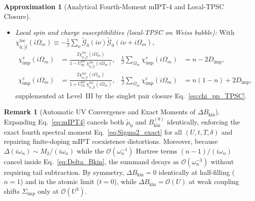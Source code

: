 \documentclass[11pt,a4paper]{article}
\numberwithin{equation}{section}
\theoremstyle{plain}
\theoremstyle{definition}
\newtheorem{approximation}{Approximation}[section]
\newtheorem{remark}{Remark}[section]
\begin{document}
\begin{approximation}[Analytical Fourth-Moment mIPT-4 and Local-TPSC Closure]
\begin{itemize}
    \item[(iii)] \emph{Local spin and charge susceptibilities (local-TPSC on Weiss bubble):}
    With $\chi_{0,\tilde{\mathcal{G}}}^{\mathrm{loc}}(i\Omega_m) \equiv -\frac{1}{\beta}\sum_\nu \tilde{\mathcal{G}}_0(i\nu)\tilde{\mathcal{G}}_0(i\nu+i\Omega_m)$,
    \begin{align}
        \chi_{\mathrm{imp}}^s(i\Omega_m)
        &= \frac{2\chi_{0,\tilde{\mathcal{G}}}^{\mathrm{loc}}(i\Omega_m)}
                {1 - U_{\mathrm{sp}}^{\mathrm{loc}}\,\chi_{0,\tilde{\mathcal{G}}}^{\mathrm{loc}}(i\Omega_m)},
        &
        \frac{1}{\beta}\sum_{\Omega_m} \chi_{\mathrm{imp}}^s(i\Omega_m)
        &= n - 2D_{\mathrm{imp}},
        \label{eq:chi_s_TPSC} \\
        \chi_{\mathrm{imp}}^c(i\Omega_m)
        &= \frac{2\chi_{0,\tilde{\mathcal{G}}}^{\mathrm{loc}}(i\Omega_m)}
                {1 + U_{\mathrm{ch}}^{\mathrm{loc}}\,\chi_{0,\tilde{\mathcal{G}}}^{\mathrm{loc}}(i\Omega_m)},
        &
        \frac{1}{\beta}\sum_{\Omega_m} \chi_{\mathrm{imp}}^c(i\Omega_m)
        &= n(1 - n) + 2D_{\mathrm{imp}},
        \label{eq:chi_c_TPSC}
    \end{align}
    supplemented at Level~III by the singlet pair closure Eq.~\eqref{eq:chi_pp_TPSC}.
\end{itemize}
\end{approximation}

\begin{remark}[Automatic UV Convergence and Exact Moments of $\Delta B_{\mathrm{kin}}$]
\label{rem:Bkin_conv}
Expanding Eq.~\eqref{eq:mIPT4} cancels both $\tilde{\mu}_0$ and $B_{\mathrm{kin}}^{(0)}$
identically, enforcing the exact fourth spectral moment Eq.~\eqref{eq:Sigma2_exact} for
all $(U,t,T,\delta)$ and repairing finite-doping mIPT coexistence distortions. Moreover,
because $\Delta(i\omega_n) \sim M_2/(i\omega_n)$ while the $\mathcal{O}(\omega_n^{-1})$
Hartree terms $(n-1)/(i\omega_n)$ cancel inside Eq.~\eqref{eq:Delta_Bkin}, the summand
decays as $\mathcal{O}(\omega_n^{-3})$ without requiring tail subtraction. By symmetry,
$\Delta B_{\mathrm{kin}} = 0$ identically at half-filling ($n=1$) and in the atomic
limit ($t=0$), while $\Delta B_{\mathrm{kin}} = \mathcal{O}(U)$ at weak coupling shifts
$\Sigma_{\mathrm{imp}}$ only at $\mathcal{O}(U^3)$.
\end{remark}
\end{document}
